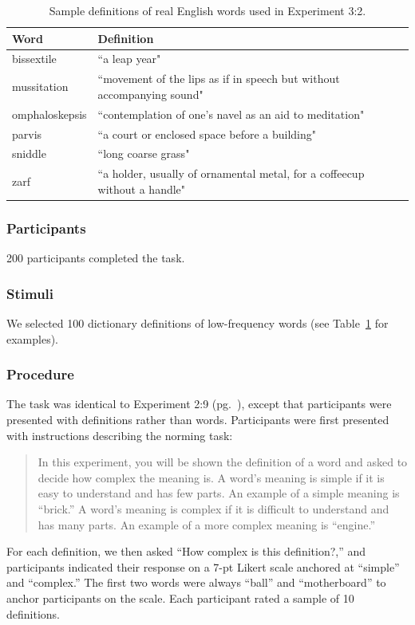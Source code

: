 \begin{table}[t!]
\centering

\begin{tabular}{ll}
\toprule
\textbf{Word} & \textbf{Definition}                \\
\toprule
   bissextile & ``a leap year"\\
   mussitation  &  \multicolumn{1}{p{12cm}}{ ``movement of the lips as if in speech but without accompanying sound"}    \\
   omphaloskepsis  &  \multicolumn{1}{p{12cm}}{ ``contemplation of one's navel as an aid to meditation"}                  \\
   parvis    &  \multicolumn{1}{p{12cm}}{ ``a court or enclosed space before a building"}                               \\
   sniddle      &  \multicolumn{1}{p{12cm}}{ ``long coarse grass"}     \\
   zarf     & \multicolumn{1}{p{12cm}}{ ``a holder, usually of ornamental metal, for a coffeecup without a handle"}                                 \\

 \bottomrule
\end{tabular}
\caption{Sample definitions of real English words used in Experiment 3:2.}
\label{tab:sample_word_defs}
\end{table}
\subsubsection{Participants}
200 participants completed the task.
\subsubsection{Stimuli}
We selected 100 dictionary definitions of low-frequency words (see Table~\ref{tab:sample_word_defs} for examples). 
\subsubsection{Procedure}
The task was identical to Experiment 2:9 (pg.\ \pageref{ch2-9}), except that participants were presented with definitions rather than words. Participants were first presented with instructions describing the norming task:
\begin{quote}
In this experiment, you will be shown the definition of a word and asked to decide how complex the meaning is. A word's meaning is simple if it is easy to understand and has few parts. An example of a simple meaning is ``brick.'' A word's meaning is complex if it is difficult to understand and has many parts. An example of a more complex meaning is ``engine.''
\end{quote}
For each definition, we then asked ``How complex is this definition?,'' and participants indicated their response on a 7-pt Likert scale anchored at ``simple'' and ``complex.'' The first two words were always ``ball'' and ``motherboard'' to anchor participants on the scale. Each participant rated a sample of 10 definitions. 

